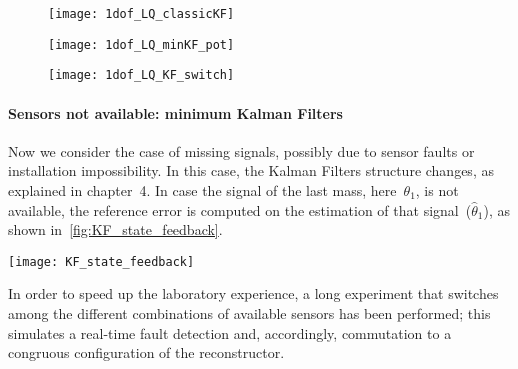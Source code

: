 \begin{figure*}
	\centering
	\begin{subfigure}{0.45\columnwidth}
		\texttt{[image: 1dof\_LQ\_classicKF]}
		\label{fig:1dof_LQ_classicKF}
	\end{subfigure}
	\begin{subfigure}{0.45\columnwidth}
		\texttt{[image: 1dof\_LQ\_minKF\_pot]}
		\label{fig:1dof_LQ_minKF_pot}
	\end{subfigure}
	\newline
	\begin{subfigure}{\columnwidth}
		\centering
		\texttt{[image: 1dof\_LQ\_KF\_switch]}
		\label{fig:1dof_LQ_KF_switch}
	\end{subfigure}
	\caption{LQG with different sensors available, \acrshort{1-dof}\ case}
\end{figure*}

\paragraph{Sensors not available: minimum Kalman Filters}

Now we consider the case of missing signals, possibly due to sensor faults or installation impossibility. In this case, the Kalman Filters structure changes, as explained in chapter~4. In case the signal of the last mass, here~$\theta_1$, is not available, the reference error is computed on the estimation of that signal~($\hat\theta_1$), as shown in~\cref{fig:KF_state_feedback}. \\

\begin{figure*}
	\centering
	\texttt{[image: KF\_state\_feedback]}
	\caption{State measurement not available: estimated state feedback, \acrshort{1-dof} case}
	\label{fig:KF_state_feedback}
\end{figure*}

In order to speed up the laboratory experience, a long experiment that switches among the different combinations of available sensors has been performed; this simulates a real-time fault detection and, accordingly, commutation to a congruous configuration of the reconstructor.

